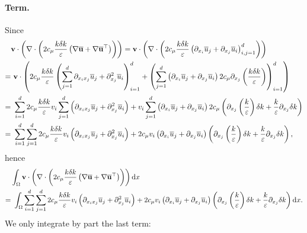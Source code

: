 \documentclass[oneside,11pt]{book}
\numberwithin{equation}{section}
\begin{document}
\paragraph*{Term.} Since
\begin{align*}
    &{\bf v}\cdot\left(\nabla\cdot\left(2c_\mu\frac{k\delta k}{\varepsilon}\left(\nabla\overline{\bf u} + \nabla\overline{\bf u}^\top\right)\right)\right) = {\bf v}\cdot\left(\nabla\cdot\left(2c_\mu\frac{k\delta k}{\varepsilon}\left(\partial_{x_i}\overline{u}_j + \partial_{x_j}\overline{u}_i\right)_{i,j=1}^d\right)\right)\\
    =&\ {\bf v}\cdot\left(2c_\mu\frac{k\delta k}{\varepsilon}\left(\sum_{j=1}^d \partial_{x_ix_j}\overline{u}_j + \partial_{x_j}^2\overline{u}_i\right)_{i=1}^d + \left(\sum_{j=1}^d \left(\partial_{x_i}\overline{u}_j + \partial_{x_j}\overline{u}_i\right)2c_\mu\partial_{x_j}\left(\frac{k\delta k}{\varepsilon}\right)\right)_{i=1}^d\right)\\
    =&\ \sum_{i=1}^d 2c_\mu\frac{k\delta k}{\varepsilon}v_i\sum_{j=1}^d \left(\partial_{x_ix_j}\overline{u}_j + \partial_{x_j}^2\overline{u}_i\right) + v_i\sum_{j=1}^d \left(\partial_{x_i}\overline{u}_j + \partial_{x_j}\overline{u}_i\right)2c_\mu\left(\partial_{x_j}\left(\frac{k}{\varepsilon}\right)\delta k + \frac{k}{\varepsilon}\partial_{x_j}\delta k\right)\\
    =&\ \sum_{i=1}^d\sum_{j=1}^d 2c_\mu\frac{k\delta k}{\varepsilon}v_i\left(\partial_{x_ix_j}\overline{u}_j + \partial_{x_j}^2\overline{u}_i\right) + 2c_\mu v_i\left(\partial_{x_i}\overline{u}_j + \partial_{x_j}\overline{u}_i\right)\left(\partial_{x_j}\left(\frac{k}{\varepsilon}\right)\delta k + \frac{k}{\varepsilon}\partial_{x_j}\delta k\right),
\end{align*}
hence
\begin{align*}
    &\int_\Omega {\bf v}\cdot\left(\nabla\cdot\left(2c_\mu\frac{k\delta k}{\varepsilon}\left(\nabla\overline{\bf u} + \nabla\overline{\bf u}^\top\right)\right)\right){\rm d}x\\
    =&\ \int_\Omega \sum_{i=1}^d\sum_{j=1}^d 2c_\mu\frac{k\delta k}{\varepsilon}v_i\left(\partial_{x_ix_j}\overline{u}_j + \partial_{x_j}^2\overline{u}_i\right) + 2c_\mu v_i\left(\partial_{x_i}\overline{u}_j + \partial_{x_j}\overline{u}_i\right)\left(\partial_{x_j}\left(\frac{k}{\varepsilon}\right)\delta k + \frac{k}{\varepsilon}\partial_{x_j}\delta k\right){\rm d}x.
\end{align*}
We only integrate by part the last term:
\end{document}
